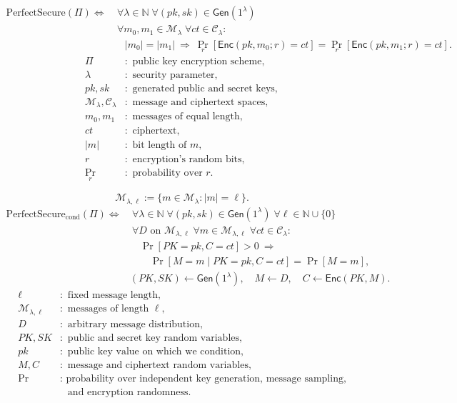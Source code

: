 \documentclass[12pt,a4paper]{article}
\begin{document}
\begin{definition}
\[
\begin{aligned}
\mathrm{PerfectSecure}(\Pi)\iff
&\ \forall\lambda\in\mathbb{N}\;
\forall(pk,sk)\in\mathsf{Gen}(1^\lambda)\\
&\ \forall m_0,m_1\in\mathcal{M}_\lambda\;
\forall ct\in\mathcal{C}_\lambda:\\[3pt]
&\quad |m_0|=|m_1|\ \Longrightarrow\
\Pr_r[\mathsf{Enc}(pk,m_0;r)=ct]
=\Pr_r[\mathsf{Enc}(pk,m_1;r)=ct].
\end{aligned}
\]
\[
\begin{aligned}
\Pi&:\text{ public key encryption scheme},\\
\lambda&:\text{ security parameter},\\
pk,sk&:\text{ generated public and secret keys},\\
\mathcal{M}_\lambda,\mathcal{C}_\lambda&:\text{ message and ciphertext spaces},\\
m_0,m_1&:\text{ messages of equal length},\\
ct&:\text{ ciphertext},\\
|m|&:\text{ bit length of }m,\\
r&:\text{ encryption's random bits},\\
\Pr_r&:\text{ probability over }r.
\end{aligned}
\]
\end{definition}

\begin{definition}
\[
\mathcal{M}_{\lambda,\ell}:=\{m\in\mathcal{M}_\lambda:|m|=\ell\}.
\]
\[
\begin{aligned}
\mathrm{PerfectSecure}_{\mathrm{cond}}(\Pi)\iff
&\ \forall\lambda\in\mathbb{N}\;
\forall(pk,sk)\in\mathsf{Gen}(1^\lambda)\;
\forall\ell\in\mathbb{N}\cup\{0\}\\
&\ \forall D\text{ on }\mathcal{M}_{\lambda,\ell}\;
\forall m\in\mathcal{M}_{\lambda,\ell}\;
\forall ct\in\mathcal{C}_\lambda:\\[2pt]
&\quad\Pr[PK=pk,C=ct]>0\ \Longrightarrow\\
&\qquad\Pr[M=m\mid PK=pk,C=ct]=\Pr[M=m],\\[3pt]
&(PK,SK)\leftarrow\mathsf{Gen}(1^\lambda),\quad
M\leftarrow D,\quad C\leftarrow\mathsf{Enc}(PK,M).
\end{aligned}
\]
\[
\begin{aligned}
\ell&:\text{ fixed message length},\\
\mathcal{M}_{\lambda,\ell}&:\text{ messages of length }\ell,\\
D&:\text{ arbitrary message distribution},\\
PK,SK&:\text{ public and secret key random variables},\\
pk&:\text{ public key value on which we condition},\\
M,C&:\text{ message and ciphertext random variables},\\
\Pr&:\text{ probability over independent key generation, message sampling,}\\
&\phantom{:}\text{ and encryption randomness}.
\end{aligned}
\]
\end{definition}
\end{document}
